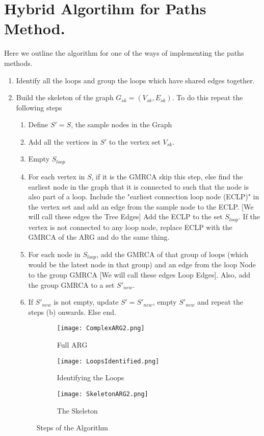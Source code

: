\section{Hybrid Algortihm for Paths Method.}
Here we outline the algorithm for one of the ways of implementing the paths methods. 
\begin{enumerate}
    \item Identify all the loops and group the loops which have shared edges together. 
    \item Build the skeleton of the graph $G_{sk} = (V_{sk}, E_{sk}) $. To do this repeat the following steps
    \begin{enumerate}
        \item Define $S' = S$, the sample nodes in the Graph
        \item Add all the vertices in $S'$ to the vertex set $V_{sk}$. 
        \item Empty $S_{loop}$
        \item For each vertex in $S$, if it is the GMRCA skip this step, else find the earliest node in the graph that it is connected to such that the node is also part of a loop. Include the "earliest connection loop node (ECLP)" in the vertex set and add an edge from the sample node to the ECLP. [We will call these edges the Tree Edges] Add the ECLP to the set $S_{loop}$. If the vertex is not connected to any loop node, replace ECLP with the GMRCA of the ARG and do the same thing. 
        \item For each node in $S_{loop}$, add the GMRCA of that group of loops (which would be the latest node in that group) and an edge from the loop Node to the group GMRCA [We will call these edges Loop Edges]. Also, add the group GMRCA to a set $S'_{new}$. 
        \item If $S'_{new}$ is not empty, update $S' = S'_{new}$, empty $S'_{new}$ and repeat the steps (b) onwards. Else end. 
    \end{enumerate}
    \begin{figure}
     \centering
     \begin{subfigure}[b]{0.28\textwidth}
         \centering
         \texttt{[image: ComplexARG2.png]}
         \caption{Full ARG}
     \end{subfigure}
     \hfill
     \begin{subfigure}[b]{0.28\textwidth}
         \centering
         \texttt{[image: LoopsIdentified.png]}
         \caption{Identifying the Loops}
     \end{subfigure} 
     \hfill
     \begin{subfigure}[b]{0.28\textwidth}
         \centering
         \texttt{[image: SkeletonARG2.png]}
         \caption{The Skeleton}
     \end{subfigure} 
        \caption{Steps of the Algorithm }
        \label{fig:three graphs}
\end{figure}


\end{enumerate}
